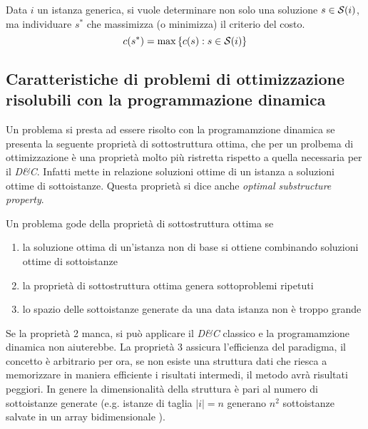 Data $i$ un istanza generica, si vuole determinare non solo una soluzione $s \in \mathcal{S}{}(i)$, ma individuare $s^*$ che massimizza (o minimizza) il criterio del costo.
\begin{equation*}
    c(s^*) = \max \left\{ c(s) : s \in \mathcal{S}{}(i) \right\}
\end{equation*}

\subsection{Caratteristiche di problemi di ottimizzazione risolubili con la programmazione dinamica}

Un problema si presta ad essere risolto con la programamzione dinamica se presenta la seguente proprietà di sottostruttura ottima, che per un prolbema di ottimizzazione è una proprietà molto più ristretta rispetto a quella necessaria per il \emph{D\&C}. Infatti mette in relazione soluzioni ottime di un istanza a soluzioni ottime di sottoistanze. Questa proprietà si dice anche \emph{optimal substructure property}.




\begin{definition}
    Un problema gode della proprietà di sottostruttura ottima se
    \begin{enumerate}
        \item la soluzione ottima di un'istanza non di base si ottiene combinando soluzioni ottime di sottoistanze
        \item la proprietà di sottostruttura ottima genera sottoproblemi ripetuti
        \item lo spazio delle sottoistanze generate da una data istanza non è troppo grande
    \end{enumerate}
\end{definition}

Se la proprietà 2 manca, si può applicare il \emph{D\&C} classico e la programamzione dinamica non aiuterebbe.
La proprietà 3 assicura l'efficienza del paradigma, il concetto è arbitrario per ora, se non esiste una struttura dati che riesca a memorizzare in maniera efficiente i risultati intermedi, il metodo avrà risultati peggiori. In genere la dimensionalità della struttura è pari al numero di sottoistanze generate (e.g. istanze di taglia $|i|=n$ generano $n^2$ sottoistanze salvate in un array bidimensionale ).

